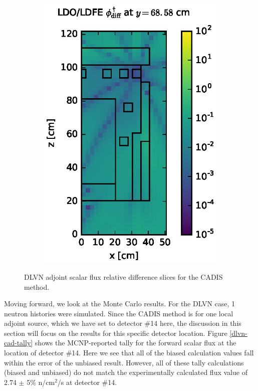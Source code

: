 \begin{figure}[!htb]
\begin{subfigure}{0.4\textwidth}
\includegraphics[max height=0.445\textheight]
{img/dlvn-plots/cad-adj/flux-diff-rel-ldfe01.eps}
\end{subfigure}
\caption{DLVN adjoint scalar flux relative difference slices for the CADIS method.}
\label{dlvn-cad-adj-diff-rel}
\end{figure}

\clearpage
Moving forward, we look at the Monte Carlo results. For the DLVN case, 1
neutron histories were simulated. Since the CADIS method is for one
local adjoint source, which we have set to detector \#14 here, the discussion in this
section will focus on the results for this specific detector location. Figure
\ref{dlvn-cad-tally} shows the MCNP-reported tally for the forward scalar flux at the
location of detector \#14. Here we see that all of the biased calculation values fall
within the error of the unbiased result. However, all of these tally calculations 
(biased and unbiased) do not match the experimentally calculated flux value of 
2.74 $\pm$ 5\% n/cm$^2$/s at detector \#14.

